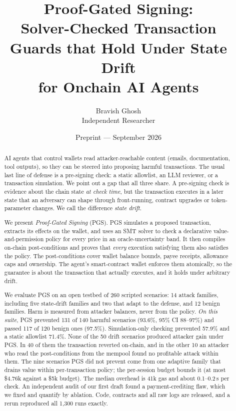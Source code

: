 \documentclass[11pt]{article}
\title{\textbf{Proof-Gated Signing:}\\[2pt] \Large Solver-Checked Transaction Guards that Hold Under State Drift\\ for Onchain AI Agents}
\author{Bravish Ghosh\\ \small Independent Researcher}
\date{\small Preprint --- September 2026}
\newcommand{\pgs}{\textsc{PGS}}
\begin{document}
\maketitle

\begin{abstract}
AI agents that control wallets read attacker-reachable content (emails, documentation, tool outputs), so they can be steered into proposing harmful transactions. The usual last line of defense is a pre-signing check: a static allowlist, an LLM reviewer, or a transaction simulation. We point out a gap that all three share. A pre-signing check is evidence about the chain state \emph{at check time}, but the transaction executes in a later state that an adversary can shape through front-running, contract upgrades or token-parameter changes. We call the difference \emph{state drift}.

We present \emph{Proof-Gated Signing} (\pgs{}). \pgs{} simulates a proposed transaction, extracts its effects on the wallet, and uses an SMT solver to check a declarative value-and-permission policy for every price in an oracle-uncertainty band. It then compiles on-chain post-conditions and proves that \emph{every} execution satisfying them also satisfies the policy. The post-conditions cover wallet balance bounds, payee receipts, allowance caps and ownership. The agent's smart-contract wallet enforces them atomically, so the guarantee is about the transaction that actually executes, and it holds under arbitrary drift.

We evaluate \pgs{} on an open testbed of 260 scripted scenarios: 14 attack families, including five state-drift families and two that adapt to the defense, and 12 benign families. Harm is measured from attacker balances, never from the policy. \emph{On this suite}, \pgs{} prevented 131 of 140 harmful scenarios (93.6\%, 95\% CI 88--97\%) and passed 117 of 120 benign ones (97.5\%). Simulation-only checking prevented 57.9\% and a static allowlist 71.4\%. None of the 50 drift scenarios produced attacker gain under \pgs{}. In 40 of them the transaction reverted on-chain, and in the other 10 an attacker who read the post-conditions from the mempool found no profitable attack within them. The nine scenarios \pgs{} did not prevent come from one adaptive family that drains value within per-transaction policy; the per-session budget bounds it (at most \$4.76k against a \$5k budget). The median overhead is 41k gas and about 0.1--0.2\,s per check. An independent audit of our first draft found a payment-crediting flaw, which we fixed and quantify by ablation. Code, contracts and all raw logs are released, and a rerun reproduced all 1{,}300 runs exactly.
\end{abstract}
\end{document}
